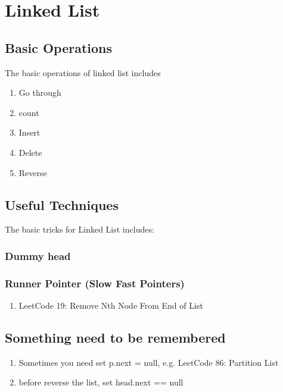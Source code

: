 \chapter{ Linked List }

\section{ Basic Operations  }
The basic operations of linked list includes
\begin{enumerate}
    \item Go through

    \item count

    \item Insert

    \item Delete

    \item Reverse

\end{enumerate}

\section{ Useful Techniques  }
The basic tricks for Linked List includes:

\subsection { Dummy head }


\subsection { Runner Pointer (Slow Fast Pointers)}
\begin{enumerate}
    \item LeetCode 19: Remove Nth Node From End of List


\end{enumerate}

\section{ Something need to be remembered  }

\begin{enumerate}
    \item Sometimes you need set p.next = null, e.g. LeetCode 86: Partition List
    \item before reverse the list, set head.next == null

\end{enumerate}


